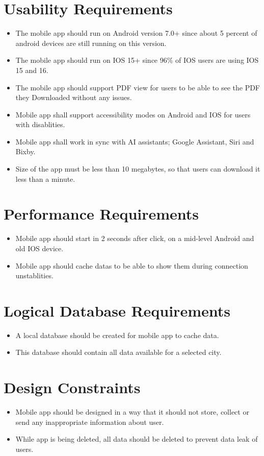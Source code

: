 \section{Usability Requirements}
\begin{itemize}
    \item The mobile app should run on Android version 7.0+ since about 5 percent of android devices are still running on this version.
    \item The mobile app should run on IOS 15+ since 96\% of IOS users are using IOS 15 and 16.
    \item The mobile app should support PDF view for users to be able to see the PDF they Downloaded without any issues.
    \item Mobile app shall support accessibility modes on Android and IOS for users with disablities.
    \item Mobile app shall work in sync with AI assistants; Google Assistant, Siri and Bixby.
    \item Size of the app must be less than 10 megabytes, so that users can download it less than a minute.
\end{itemize}
\section{Performance Requirements}
\begin{itemize}
    \item Mobile app should start in 2 seconds after click, on a mid-level Android and old IOS device.
    \item Mobile app should cache datas to be able to show them during connection unstablities.
\end{itemize}
\section{Logical Database Requirements}
\begin{itemize}
    \item A local database should be created for mobile app to cache data.
    \item This database should contain all data available for a selected city.
\end{itemize}
\section{Design Constraints}
\begin{itemize}
    \item Mobile app should be designed in a way that it should not store, collect or send any inappropriate information about user.
    \item While app is being deleted, all data should be deleted to prevent data leak of users.
\end{itemize}
